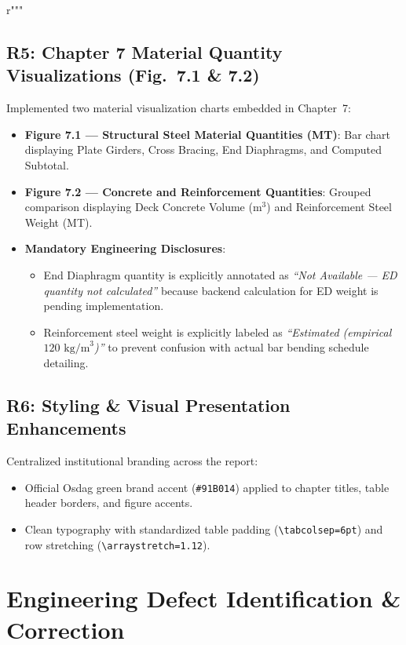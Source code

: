 r"""\documentclass[11pt,a4paper]{article}
\begin{document}
\subsection{R5: Chapter 7 Material Quantity Visualizations (Fig.~7.1 \& 7.2)}
Implemented two material visualization charts embedded in Chapter~7:
\begin{itemize}
    \item \textbf{Figure 7.1 --- Structural Steel Material Quantities (MT)}: Bar chart displaying Plate Girders, Cross Bracing, End Diaphragms, and Computed Subtotal.
    \item \textbf{Figure 7.2 --- Concrete and Reinforcement Quantities}: Grouped comparison displaying Deck Concrete Volume ($\text{m}^3$) and Reinforcement Steel Weight (MT).
    \item \textbf{Mandatory Engineering Disclosures}:
    \begin{itemize}
        \item End Diaphragm quantity is explicitly annotated as \textit{``Not Available --- ED quantity not calculated''} because backend calculation for ED weight is pending implementation.
        \item Reinforcement steel weight is explicitly labeled as \textit{``Estimated (empirical $120\text{ kg/m}^3$)''} to prevent confusion with actual bar bending schedule detailing.
    \end{itemize}
\end{itemize}

\subsection{R6: Styling \& Visual Presentation Enhancements}
Centralized institutional branding across the report:
\begin{itemize}
    \item Official Osdag green brand accent (\texttt{\#91B014}) applied to chapter titles, table header borders, and figure accents.
    \item Clean typography with standardized table padding (\texttt{\textbackslash tabcolsep=6pt}) and row stretching (\texttt{\textbackslash arraystretch=1.12}).
\end{itemize}

\section{Engineering Defect Identification \& Correction}
\end{document}
